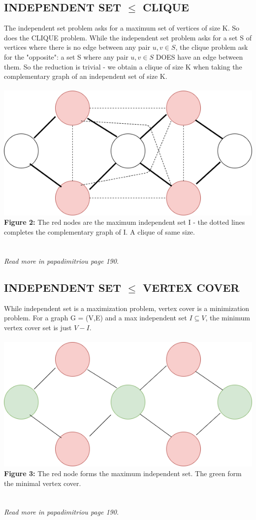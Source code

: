 \documentclass{article}
\begin{document}
\subsection{INDEPENDENT SET $\le$ CLIQUE}
The independent set problem asks for a maximum set of vertices of size K. So does the CLIQUE problem. While the independent set problem asks for a set S of vertices where there is no edge between any pair $u,v \in S$, the clique problem ask for the "opposite": a set S where any pair $u,v \in S$ DOES have an edge between them. So the reduction is trivial - we obtain a clique of size K when taking the complementary graph of an independent set of size K.\\\\
\includegraphics[scale=0.5]{IStoCLIQ}\\
\textbf{Figure 2:} The red nodes are the maximum independent set I - the dotted lines completes the complementary graph of I. A clique of same size.
\\\\\\
\textit{Read more in papadimitriou page 190.}
\newpage
\subsection{INDEPENDENT SET $\le$ VERTEX COVER}
While independent set is a maximization problem, vertex cover is a minimization problem. For a graph G = (V,E) and a max independent set $I \subseteq V$, the minimum vertex cover set is just $V-I$.\\\\
\includegraphics[scale=0.5]{IStoCOVER}\\
\textbf{Figure 3:} The red node forms the maximum independent set. The green form the minimal vertex cover.
\\\\\\
\textit{Read more in papadimitriou page 190.}
\newpage
\end{document}
